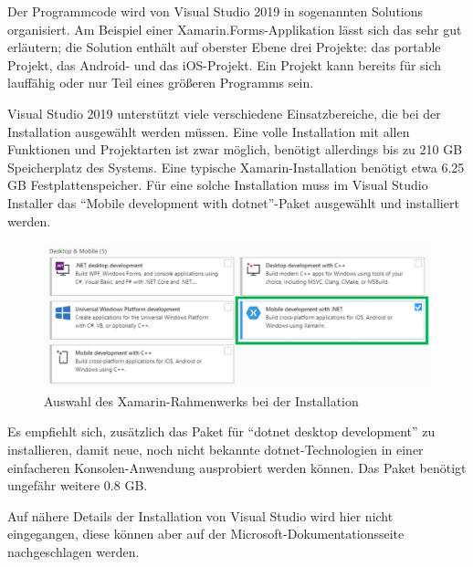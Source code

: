 Der Programmcode wird von Visual Studio 2019 in sogenannten Solutions organisiert.
Am Beispiel einer Xamarin.Forms-Applikation lässt sich das sehr gut erläutern;
die Solution enthält auf oberster Ebene drei Projekte: das portable Projekt, das Android- und das iOS-Projekt.
Ein Projekt kann bereits für sich lauffähig oder nur Teil eines größeren Programms sein.\par

Visual Studio 2019 unterstützt viele verschiedene Einsatzbereiche, die bei der Installation ausgewählt werden müssen.
Eine volle Installation mit allen Funktionen und Projektarten ist zwar möglich, benötigt allerdings bis zu 210 GB Speicherplatz des Systems.
Eine typische Xamarin-Installation benötigt etwa 6.25 GB Festplattenspeicher.
Für eine solche Installation muss im Visual Studio Installer das \enquote{Mobile development with \ac{dotnet}}-Paket ausgewählt und installiert werden.
\begin{figure}[H]
    \centering\includegraphics[width=0.9\linewidth]{images/auswahl_rahmenwerk/installation.png}    
    \caption{Auswahl des Xamarin-Rahmenwerks bei der Installation}
\end{figure}
Es empfiehlt sich, zusätzlich das Paket für \enquote{\ac{dotnet} desktop development} zu installieren, damit neue, noch nicht bekannte \ac{dotnet}-Technologien in einer einfacheren Konsolen-Anwen\-dung ausprobiert werden können.
Das Paket benötigt ungefähr weitere 0.8 GB.\par
Auf nähere Details der Installation von Visual Studio wird hier nicht eingegangen, diese können aber auf der Microsoft-Dokumentationsseite \cite[vgl.][]{msdoc-vs-install} nachgeschlagen werden.
%
